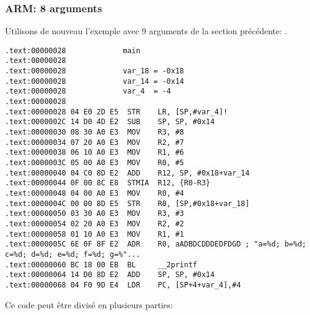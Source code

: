 \subsubsection{ARM: 8 arguments}

Utilisons de nouveau l'exemple avec 9 arguments de la section précédente: .



\myparagraph{\OptimizingKeilVI: \ARMMode}

\begin{lstlisting}[style=customasmARM]
.text:00000028             main
.text:00000028
.text:00000028             var_18 = -0x18
.text:00000028             var_14 = -0x14
.text:00000028             var_4  = -4
.text:00000028
.text:00000028 04 E0 2D E5  STR    LR, [SP,#var_4]!
.text:0000002C 14 D0 4D E2  SUB    SP, SP, #0x14
.text:00000030 08 30 A0 E3  MOV    R3, #8
.text:00000034 07 20 A0 E3  MOV    R2, #7
.text:00000038 06 10 A0 E3  MOV    R1, #6
.text:0000003C 05 00 A0 E3  MOV    R0, #5
.text:00000040 04 C0 8D E2  ADD    R12, SP, #0x18+var_14
.text:00000044 0F 00 8C E8  STMIA  R12, {R0-R3}
.text:00000048 04 00 A0 E3  MOV    R0, #4
.text:0000004C 00 00 8D E5  STR    R0, [SP,#0x18+var_18]
.text:00000050 03 30 A0 E3  MOV    R3, #3
.text:00000054 02 20 A0 E3  MOV    R2, #2
.text:00000058 01 10 A0 E3  MOV    R1, #1
.text:0000005C 6E 0F 8F E2  ADR    R0, aADBDCDDDEDFDGD ; "a=%d; b=%d; c=%d; d=%d; e=%d; f=%d; g=%"...
.text:00000060 BC 18 00 EB  BL     __2printf
.text:00000064 14 D0 8D E2  ADD    SP, SP, #0x14
.text:00000068 04 F0 9D E4  LDR    PC, [SP+4+var_4],#4
\end{lstlisting}

Ce code peut être divisé en plusieurs parties:

